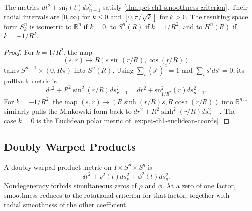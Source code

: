 \begin{example}
  \label{ex:pet-ch1-space-forms}
  \leanok
  The metrics
  $dt^2+\mathrm{sn}_k^2(t)ds_{n-1}^2$ satisfy
  \cref{thm:pet-ch1-smoothness-criterion}. Their radial intervals are
  $[0,\infty)$ for $k\le0$ and $[0,\pi/\sqrt{k}]$ for $k>0$. The resulting
  space form $S_k^n$ is isometric to $\mathbb{R}^n$ if $k=0$, to $S^n(R)$ if
  $k=1/R^2$, and to $H^n(R)$ if $k=-1/R^2$.
\end{example}
\begin{proof}
  \leanok
  \sketch
  For $k=1/R^2$, the map
  \[
    (s,r)\longmapsto R(s\sin(r/R),\cos(r/R))
  \]
  takes $S^{n-1}\times(0,R\pi)$ into $S^n(R)$. Using
  $\sum_i(s^i)^2=1$ and $\sum_i s^i ds^i=0$, its pullback metric is
  \[
    dr^2+R^2\sin^2(r/R)ds_{n-1}^2
      =dr^2+\mathrm{sn}_{1/R^2}^2(r)ds_{n-1}^2.
  \]
  For $k=-1/R^2$, the map
  $(s,r)\mapsto(R\sinh(r/R)s,R\cosh(r/R))$ into $\mathbb{R}^{n,1}$ similarly
  pulls the Minkowski form back to
  $dr^2+R^2\sinh^2(r/R)ds_{n-1}^2$. The case $k=0$ is the Euclidean polar
  metric of \cref{ex:pet-ch1-euclidean-coords}.
\end{proof}

\subsection{Doubly Warped Products}

\begin{definition}
  \label{def:pet-ch1-doubly-warped}
  \leanok
  A doubly warped product metric on $I\times S^p\times S^q$ is
  \[
    dt^2+\rho^2(t)ds_p^2+\phi^2(t)ds_q^2.
  \]
  Nondegeneracy forbids simultaneous zeros of $\rho$ and $\phi$. At a zero of
  one factor, smoothness reduces to the rotational criterion for that factor,
  together with radial smoothness of the other coefficient.
\end{definition}

